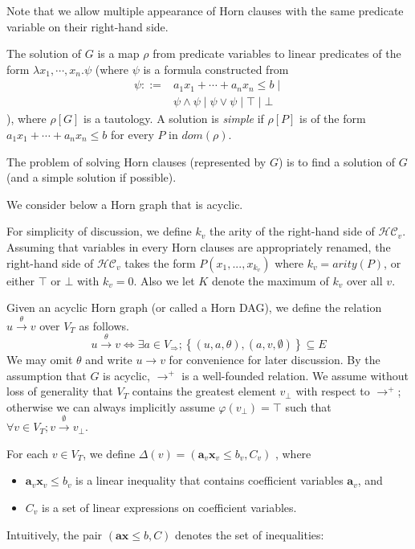 \documentclass[a4paper,12pt]{article}
\begin{document}
Note that we allow multiple appearance of Horn clauses with the same
predicate variable on their right-hand side.

The solution of $G$ is a map $\rho$ from predicate variables to linear
predicates of the form $\lambda x_1, \cdots ,x_n. \psi $ (where $\psi$
is a formula constructed from
\begin{align*}
\psi ::= & a_1 x_1 + \cdots + a_n x_n \leq b \mid \\
& \psi \wedge \psi \mid \psi \vee \psi \mid \top \mid \bot
\end{align*}
), where $\rho[G]$ is a tautology. A solution is \textit{simple} if
$\rho[P]$ is of the form $a_1 x_1 + \cdots + a_n x_n \leq b$ for every
$P$ in $dom(\rho)$.

The problem of solving Horn clauses (represented by $G$) is to find a
solution of $G$ (and a simple solution if possible).

We consider below a Horn graph that is acyclic.

For simplicity of discussion, we define $k_v$ the arity of the
right-hand side of $\mathcal{HC}_v$. Assuming that variables in every
Horn clauses are appropriately renamed, the right-hand side of
$\mathcal{HC}_v$ takes the form $P(x_1,...,x_{k_v})$ where $k_v =
arity(P)$, or either $\top$ or $\bot$ with $k_v = 0$. Also we let $K$
denote the maximum of $k_v$ over all $v$.

Given an acyclic Horn graph (or called a Horn DAG), we define the
relation $u \xrightarrow{\theta} v$ over $V_T$ as follows.
\[ u \xrightarrow{\theta} v \Longleftrightarrow
\exists a \in V_\Rightarrow; \left\lbrace (u,a,\theta), (a,v,\emptyset) \right\rbrace \subseteq E \]
We may omit $\theta$ and write $u \rightarrow v$ for convenience for
later discussion. By the assumption that $G$ is acyclic,
$\rightarrow^+$ is a well-founded relation. We assume without loss of
generality that $V_T$ contains the greatest element $v_\bot$ with
respect to $\rightarrow^+$; otherwise we can always implicitly assume
$\varphi(v_\bot) = \top$ such that $\forall v \in V_T; v
\xrightarrow{\emptyset} v_\bot$.

For each $v \in V_T$, we define
$\Delta(v) = (\mathbf{a}_v \mathbf{x}_v \leq b_v, C_v)$
, where
\begin{itemize}
\item $\mathbf{a}_v \mathbf{x}_v \leq b_v$ is a linear inequality that
  contains coefficient variables $\mathbf{a}_v$, and
\item $C_v$ is a set of linear expressions on coefficient variables.
\end{itemize}
Intuitively, the pair $(\mathbf{a} \mathbf{x} \leq b, C)$ denotes the
set of inequalities:
\end{document}
